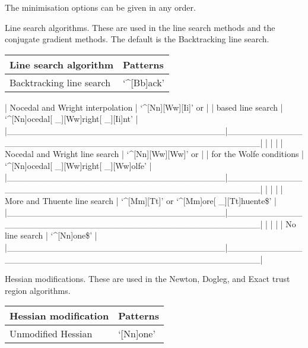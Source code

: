 The minimisation options can be given in any order.


Line search algorithms.  These are used in the line search methods and the conjugate gradient
methods.  The default is the Backtracking line search.


\begin{center}
\begin{tabular}{ll}
\toprule
Line search algorithm & Patterns \\
\midrule
 Backtracking line search           &  `\^{}[Bb]ack'                                           \\
\bottomrule
\end{tabular}
\end{center}

| Nocedal and Wright interpolation  | `\^{}[Nn][Ww][Ii]' or                                  |
| based line search                 | `\^{}[Nn]ocedal[ \_][Ww]right[ \_][Ii]nt'                |
|\_\_\_\_\_\_\_\_\_\_\_\_\_\_\_\_\_\_\_\_\_\_\_\_\_\_\_\_\_\_\_\_\_\_\_|\_\_\_\_\_\_\_\_\_\_\_\_\_\_\_\_\_\_\_\_\_\_\_\_\_\_\_\_\_\_\_\_\_\_\_\_\_\_\_\_\_\_\_\_\_\_\_\_\_\_\_\_\_|
|                                   |                                                     |
| Nocedal and Wright line search    | `\^{}[Nn][Ww][Ww]' or                                  |
| for the Wolfe conditions          | `\^{}[Nn]ocedal[ \_][Ww]right[ \_][Ww]olfe'              |
|\_\_\_\_\_\_\_\_\_\_\_\_\_\_\_\_\_\_\_\_\_\_\_\_\_\_\_\_\_\_\_\_\_\_\_|\_\_\_\_\_\_\_\_\_\_\_\_\_\_\_\_\_\_\_\_\_\_\_\_\_\_\_\_\_\_\_\_\_\_\_\_\_\_\_\_\_\_\_\_\_\_\_\_\_\_\_\_\_|
|                                   |                                                     |
| More and Thuente line search      | `\^{}[Mm][Tt]' or `\^{}[Mm]ore[ \_][Tt]huente\$'            |
|\_\_\_\_\_\_\_\_\_\_\_\_\_\_\_\_\_\_\_\_\_\_\_\_\_\_\_\_\_\_\_\_\_\_\_|\_\_\_\_\_\_\_\_\_\_\_\_\_\_\_\_\_\_\_\_\_\_\_\_\_\_\_\_\_\_\_\_\_\_\_\_\_\_\_\_\_\_\_\_\_\_\_\_\_\_\_\_\_|
|                                   |                                                     |
| No line search                    | `\^{}[Nn]one\$'                                         |
|\_\_\_\_\_\_\_\_\_\_\_\_\_\_\_\_\_\_\_\_\_\_\_\_\_\_\_\_\_\_\_\_\_\_\_|\_\_\_\_\_\_\_\_\_\_\_\_\_\_\_\_\_\_\_\_\_\_\_\_\_\_\_\_\_\_\_\_\_\_\_\_\_\_\_\_\_\_\_\_\_\_\_\_\_\_\_\_\_|



Hessian modifications.  These are used in the Newton, Dogleg, and Exact trust region algorithms.


\begin{center}
\begin{tabular}{ll}
\toprule
Hessian modification & Patterns \\
\midrule
 Unmodified Hessian                 &  `[Nn]one'                                            \\
\bottomrule
\end{tabular}
\end{center}


